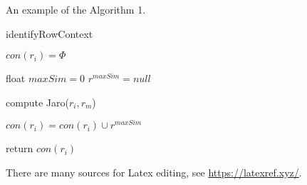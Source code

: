 An example of the Algorithm 1.


\begin{algorithm} 
	\SetAlgoVlined 
	\caption{identifyRowContext} 
	$con(r_i)= \Phi$\; 
	{ 
		float $maxSim=0$\; 
		$r^{maxSim}=null$\; 
		{ 
			compute Jaro($r_i,r_m$)\; 

		} 
		$con(r_i)=con(r_i)\cup {r^{maxSim}}$\; 
	} 
	return $con(r_i)$\; 
\end{algorithm}


There are many sources for Latex editing, see \url{https://latexref.xyz/}.